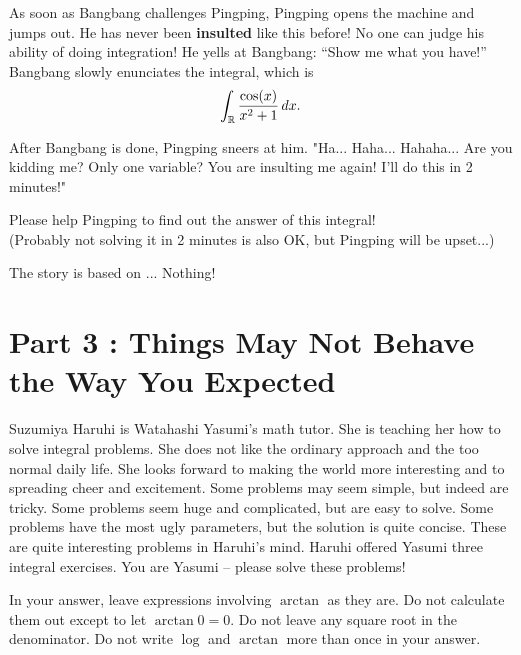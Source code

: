 \documentclass[12pt]{article}
\begin{document}
\par As soon as Bangbang challenges Pingping, Pingping opens the machine and jumps out. He has never been \textbf{insulted} like 
this before! No one can judge his ability of doing integration! He yells at Bangbang: ``Show me what you have!''
Bangbang slowly enunciates the integral, which is
\begin{equation*}
    \int_{\mathbb{R}} \frac{\cos (x)}{x^2+1}\,dx. 
\end{equation*}

\par After Bangbang is done, Pingping sneers at him. "Ha... Haha... Hahaha... Are you kidding me? Only one variable? 
You are insulting me again! I'll do this in 2 minutes!"

\par Please help Pingping to find out the answer of this integral!\\

\hfill (Probably not solving it in 2 minutes is also OK, but Pingping will be upset...)

\begin{flushright}
    The story is based on ... Nothing!
\end{flushright}

\newpage
\section*{Part 3 : Things May Not Behave the Way You Expected}

Suzumiya Haruhi is Watahashi Yasumi's math tutor. She is teaching her how to solve integral problems. She does not like the ordinary approach and the too normal daily life. She looks forward to making the world more interesting and to spreading cheer and excitement. Some problems may seem simple, but indeed  are tricky. Some problems seem huge and complicated, but are easy to solve. Some problems have the most ugly parameters, but the solution is quite concise. These are quite interesting problems in Haruhi's mind. Haruhi offered Yasumi three integral exercises. You are Yasumi -- please solve these problems!

\par In your answer, leave expressions involving $\arctan$ as  they are. Do not calculate them out except to let $\arctan 0 = 0$. Do not leave any square root in the denominator. Do not write $\log$ and $\arctan$ more than once in your answer.
\end{document}

